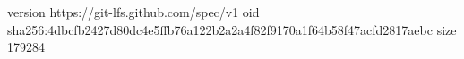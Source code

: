 version https://git-lfs.github.com/spec/v1
oid sha256:4dbcfb2427d80dc4e5ffb76a122b2a2a4f82f9170a1f64b58f47acfd2817aebc
size 179284
